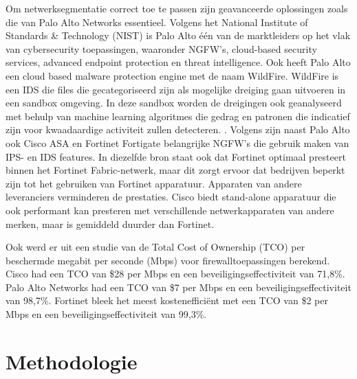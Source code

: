 Om netwerksegmentatie correct toe te passen zijn geavanceerde oplossingen zoals die van Palo Alto Networks essentieel. Volgens het National Institute of Standards \& Technology (NIST) is Palo Alto één van de marktleiders op het vlak van cybersecurity toepassingen, waaronder NGFW’s, cloud-based security services, advanced endpoint protection en threat intelligence. \autocite{TechnicalWhitepaper2014} Ook heeft Palo Alto een cloud based malware protection engine met de naam WildFire. WildFire is een IDS die files die gecategoriseerd zijn als mogelijke dreiging gaan uitvoeren in een sandbox omgeving. In deze sandbox worden de dreigingen ook geanalyseerd met behulp van machine learning algoritmes die gedrag en patronen die indicatief zijn voor kwaadaardige activiteit zullen detecteren. \autocite{PaloAltoWF2024}. Volgens \textcite{Faizan2019} zijn naast Palo Alto ook Cisco ASA en Fortinet Fortigate belangrijke NGFW's die gebruik maken van IPS- en IDS features. In diezelfde bron staat ook dat Fortinet optimaal presteert binnen het Fortinet Fabric-netwerk, maar dit zorgt ervoor dat bedrijven beperkt zijn tot het gebruiken van Fortinet apparatuur. Apparaten van andere leveranciers verminderen de prestaties. Cisco biedt stand-alone apparatuur die ook performant kan presteren met verschillende netwerkapparaten van andere merken, maar is gemiddeld duurder dan Fortinet. 

Ook werd er uit een studie van \textcite{Skybakmoen2018} de Total Cost of Ownership (TCO) per beschermde megabit per seconde (Mbps) voor firewalltoepassingen berekend. Cisco had een TCO van \$28 per Mbps en een beveiligingseffectiviteit van 71,8\%. Palo Alto Networks had een TCO van \$7 per Mbps en een beveiligingseffectiviteit van 98,7\%. Fortinet bleek het meest kostenefficiënt met een TCO van \$2 per Mbps en een beveiligingseffectiviteit van 99,3\%.


\section{Methodologie}%
\label{sec:methodologie}

